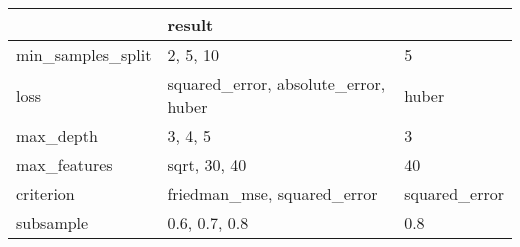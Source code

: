 \begin{tabular}{lll}
\toprule
{} &         result \\
\midrule
min\_samples\_split &                              2, 5, 10 &              5 \\
loss              &  squared\_error, absolute\_error, huber &          huber \\
max\_depth         &                               3, 4, 5 &              3 \\
max\_features      &                          sqrt, 30, 40 &             40 \\
criterion         &           friedman\_mse, squared\_error &  squared\_error \\
subsample         &                         0.6, 0.7, 0.8 &            0.8 \\
\bottomrule
\end{tabular}
